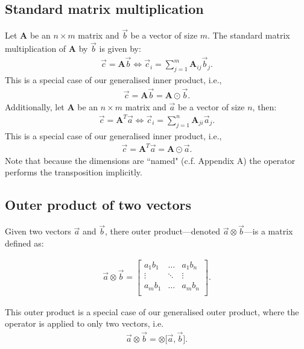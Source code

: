 \documentclass[twoside,11pt]{article}
\begin{document}
\subsection*{Standard matrix multiplication}

Let $\bm{A}$ be an $n \times m$ matrix and $\vec{b}$ be a vector of size $m$. The standard matrix multiplication of $\bm{A}$ by $\vec{b}$ is given by:
\begin{align}
\vec{c} = \bm{A} \vec{b} \Leftrightarrow \vec{c}_i = \sum_{j = 1}^{m} \bm{A}_{ij} \vec{b}_j.
\end{align}
This is a special case of our generalised inner product, i.e.,
\begin{align}
\vec{c} = \bm{A}\vec{b} = \bm{A} \odot \vec{b}.
\end{align}
Additionally, let $\bm{A}$ be an $n \times m$ matrix and $\vec{a}$ be a vector of size $n$, then:
\begin{align}
\vec{c} = \bm{A}^T \vec{a} \Leftrightarrow \vec{c}_i = \sum_{j = 1}^{n} \bm{A}_{ji} \vec{a}_j.
\end{align}
This is a special case of our generalised inner product, i.e.,
\begin{align}
\vec{c} = \bm{A}^T\vec{a} = \bm{A} \odot \vec{a}.
\end{align}
Note that because the dimensions are ``named" (c.f. Appendix A) the operator performs the transposition implicitly.

\subsection*{Outer product of two vectors}

Given two vectors $\vec{a}$ and $\vec{b}$, there outer product---denoted $\vec{a} \otimes \vec{b}$---is a matrix defined as:

\begin{align}
\vec{a} \otimes \vec{b} = \begin{bmatrix}
a_1b_1 & \ldots & a_1b_n\\
\vdots & \ddots & \vdots\\
a_mb_1 & \ldots & a_mb_n\\
\end{bmatrix}.
\end{align}

This outer product is a special case of our generalised outer product, where the operator is applied to only two vectors, i.e.
\begin{align}
\vec{a} \otimes \vec{b} = \otimes \Big[\vec{a}, \vec{b}\Big].
\end{align}
\end{document}
